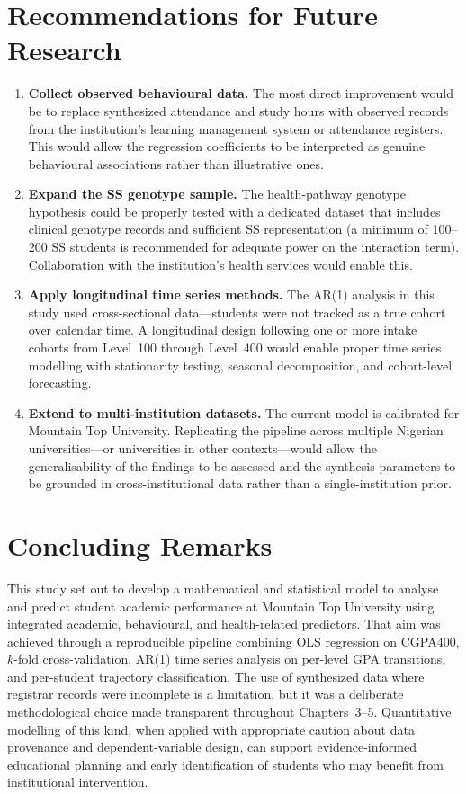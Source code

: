 \documentclass[12pt]{report}
\begin{document}
	\section{Recommendations for Future Research}
	\begin{enumerate}
		\item \textbf{Collect observed behavioural data.} The most direct improvement would be to replace synthesized attendance and study hours with observed records from the institution's learning management system or attendance registers. This would allow the regression coefficients to be interpreted as genuine behavioural associations rather than illustrative ones.
		
		\item \textbf{Expand the SS genotype sample.} The health-pathway genotype hypothesis could be properly tested with a dedicated dataset that includes clinical genotype records and sufficient SS representation (a minimum of 100--200 SS students is recommended for adequate power on the interaction term). Collaboration with the institution's health services would enable this.
		
		\item \textbf{Apply longitudinal time series methods.} The AR(1) analysis in this study used cross-sectional data---students were not tracked as a true cohort over calendar time. A longitudinal design following one or more intake cohorts from Level~100 through Level~400 would enable proper time series modelling with stationarity testing, seasonal decomposition, and cohort-level forecasting.
		
		\item \textbf{Extend to multi-institution datasets.} The current model is calibrated for Mountain Top University. Replicating the pipeline across multiple Nigerian universities---or universities in other contexts---would allow the generalisability of the findings to be assessed and the synthesis parameters to be grounded in cross-institutional data rather than a single-institution prior.
	\end{enumerate}
	
	\section{Concluding Remarks}
	This study set out to develop a mathematical and statistical model to analyse and predict student academic performance at Mountain Top University using integrated academic, behavioural, and health-related predictors. That aim was achieved through a reproducible pipeline combining OLS regression on CGPA400, $k$-fold cross-validation, AR(1) time series analysis on per-level GPA transitions, and per-student trajectory classification. The use of synthesized data where registrar records were incomplete is a limitation, but it was a deliberate methodological choice made transparent throughout Chapters~3--5. Quantitative modelling of this kind, when applied with appropriate caution about data provenance and dependent-variable design, can support evidence-informed educational planning and early identification of students who may benefit from institutional intervention.
	
\end{document}
